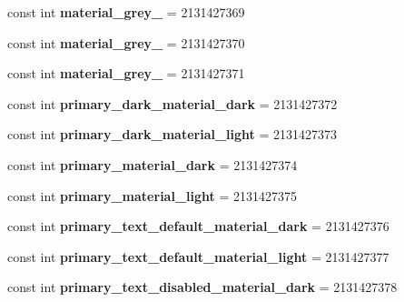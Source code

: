 \begin{DoxyCompactItemize}
const int {\bfseries material\+\_\+grey\+\_} = 2131427369
\item 
\mbox{\label{classXaria_1_1Resource_1_1Color_a998b0c2996ca8b7e4694e704bcb6a004}} 
const int {\bfseries material\+\_\+grey\+\_} = 2131427370
\item 
\mbox{\label{classXaria_1_1Resource_1_1Color_ad2f5ccf1bbf4cbad24498deac39791df}} 
const int {\bfseries material\+\_\+grey\+\_} = 2131427371
\item 
\mbox{\label{classXaria_1_1Resource_1_1Color_a33274265546bb8dd3f9c45b5a444f8c1}} 
const int {\bfseries primary\+\_\+dark\+\_\+material\+\_\+dark} = 2131427372
\item 
\mbox{\label{classXaria_1_1Resource_1_1Color_a46c632b17bcec9d286cb7495b44b5224}} 
const int {\bfseries primary\+\_\+dark\+\_\+material\+\_\+light} = 2131427373
\item 
\mbox{\label{classXaria_1_1Resource_1_1Color_a7642de8aebd7d04e88f67b2c842caa7d}} 
const int {\bfseries primary\+\_\+material\+\_\+dark} = 2131427374
\item 
\mbox{\label{classXaria_1_1Resource_1_1Color_ada29e0d1027ffc89ef8751eb0a0b812c}} 
const int {\bfseries primary\+\_\+material\+\_\+light} = 2131427375
\item 
\mbox{\label{classXaria_1_1Resource_1_1Color_a2a5cfa66c44572f42ad4303e8a2e0486}} 
const int {\bfseries primary\+\_\+text\+\_\+default\+\_\+material\+\_\+dark} = 2131427376
\item 
\mbox{\label{classXaria_1_1Resource_1_1Color_aca9b35bb95795426f6dd614310977bd6}} 
const int {\bfseries primary\+\_\+text\+\_\+default\+\_\+material\+\_\+light} = 2131427377
\item 
\mbox{\label{classXaria_1_1Resource_1_1Color_a76c6a96bcea52dc4b2f955a886b307af}} 
const int {\bfseries primary\+\_\+text\+\_\+disabled\+\_\+material\+\_\+dark} = 2131427378

\end{DoxyCompactItemize}
